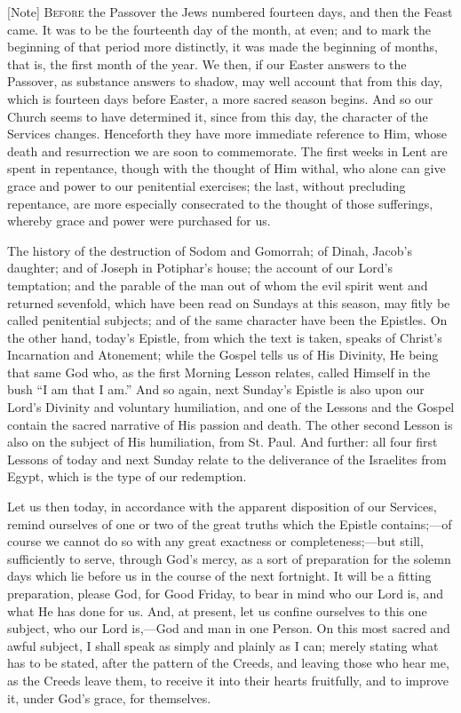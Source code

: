 [Note] B\textsc{efore} the Passover the Jews
numbered fourteen days, and then the Feast came. It was to be the
fourteenth day of the month, at even; and to mark the beginning of that
period more distinctly, it was made the beginning of months, that is,
the first month of the year. We then, if our Easter answers to the
Passover, as substance answers to shadow, may well account that from
this day, which is fourteen days before Easter, a more sacred season
begins. And so our Church seems to have determined it, since from this
day, the character of the Services changes. Henceforth they have more
immediate reference to Him, whose death and resurrection we are soon to
commemorate. The first weeks in Lent are spent in repentance, though
with the thought of Him withal, who alone can give grace and power to
our penitential exercises; the last, without precluding repentance, are
more especially consecrated to the thought of those sufferings, whereby
grace and power were purchased for us.

The history of the destruction of Sodom and Gomorrah; of Dinah,
Jacob's daughter; and of Joseph in Potiphar's house; the account of our
Lord's temptation; and the parable of the man out of whom the evil
spirit went and returned sevenfold, which have been read on Sundays at
this season, may fitly be called penitential subjects; and of the same
character have been the Epistles. On the other hand, today's Epistle,
from which the text is taken, speaks of Christ's Incarnation and
Atonement; while the Gospel tells us of His Divinity, He being that same
God who, as the first Morning Lesson relates, called Himself in the bush
``I am that I am.'' And so again, next Sunday's Epistle is also
upon our Lord's Divinity and voluntary humiliation, and one of the
Lessons and the Gospel contain the sacred narrative of His passion and
death. The other second Lesson is also on the subject of His
humiliation, from St. Paul. And further: all four first Lessons of today
and next Sunday relate to the deliverance of the Israelites from Egypt,
which is the type of our redemption.

Let us then today, in accordance with the apparent disposition of our
Services, remind ourselves of one or two of the great truths which the
Epistle contains;—of course we cannot do so with any great exactness
or completeness;—but still, sufficiently to serve, through God's
mercy, as a sort of preparation for the solemn days which lie before us
in the course of the next fortnight. It will be a fitting preparation,
please God, for Good Friday, to bear in mind who our Lord is, and what
He has done for us. And, at present, let us confine ourselves to this
one subject, who our Lord is,—God and man in one Person. On this most
sacred and awful subject, I shall speak as simply and plainly as I can;
merely stating what has to be stated, after the pattern of the Creeds,
and leaving those who hear me, as the Creeds leave them, to receive it
into their hearts fruitfully, and to improve it, under God's grace, for
themselves.

